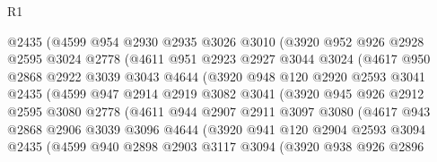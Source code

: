 \begin{lexlean}{R1}
\begin{coremodule}
                @2435
                (@4599
                  @954
                  @2930
                  @2935
                  @3026
                  @3010
                  (@3920
                    @952
                    @926
                    @2928
                    @2595
                    @3024
                    @2778
                    (@4611
                      @951
                      @2923
                      @2927
                      @3044
                      @3024
                      (@4617
                        @950
                        @2868
                        @2922
                        @3039
                        @3043
                        @4644
                        (@3920
                          @948
                          @120
                          @2920
                          @2593
                          @3041
                          @2435
                          (@4599
                            @947
                            @2914
                            @2919
                            @3082
                            @3041
                            (@3920
                              @945
                              @926
                              @2912
                              @2595
                              @3080
                              @2778
                              (@4611
                                @944
                                @2907
                                @2911
                                @3097
                                @3080
                                (@4617
                                  @943
                                  @2868
                                  @2906
                                  @3039
                                  @3096
                                  @4644
                                  (@3920
                                    @941
                                    @120
                                    @2904
                                    @2593
                                    @3094
                                    @2435
                                    (@4599
                                      @940
                                      @2898
                                      @2903
                                      @3117
                                      @3094
                                      (@3920
                                        @938
                                        @926
                                        @2896

\end{coremodule}
\end{lexlean}
